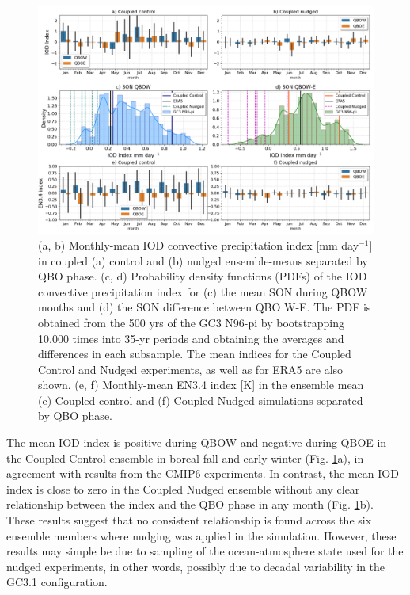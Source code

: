 \begin{figure}[t!]
\centering
 \includegraphics[width=\linewidth]{figures/iod_suites.png}
\caption[IOD and ENSO indices in nudged versus control experiments]{(a, b) Monthly-mean IOD convective precipitation index [mm day$^{-1}$] in coupled (a) control and (b) nudged ensemble-means separated by QBO phase. (c, d) Probability density functions (PDFs) of the IOD convective precipitation index for (c) the mean SON during QBOW months and (d) the SON difference between QBO W-E. The PDF is obtained from the 500 yrs of the GC3 N96-pi by bootstrapping 10,000 times into 35-yr periods and obtaining the averages and differences in each subsample. The mean indices for the Coupled Control and Nudged experiments, as well as for ERA5 are also shown. (e, f) Monthly-mean EN3.4 index [K] in the ensemble mean (e) Coupled control and (f) Coupled Nudged simulations separated by QBO phase.   }
\label{fig:iod_suites}
\end{figure}

The mean IOD index is positive during QBOW and negative during QBOE in the Coupled Control ensemble in boreal fall and early winter (Fig. \ref{fig:iod_suites}a), in agreement with results from the CMIP6 experiments. In contrast, the mean IOD index is close to zero in the Coupled Nudged ensemble without any clear relationship between the index and the QBO phase in any month (Fig. \ref{fig:iod_suites}b). 
These results suggest that no consistent relationship is found across the six ensemble members where nudging was applied in the simulation. 
However, these results may simple be due to sampling of the ocean-atmosphere state used for the nudged experiments, in other words, possibly due to decadal variability in the GC3.1 configuration.

